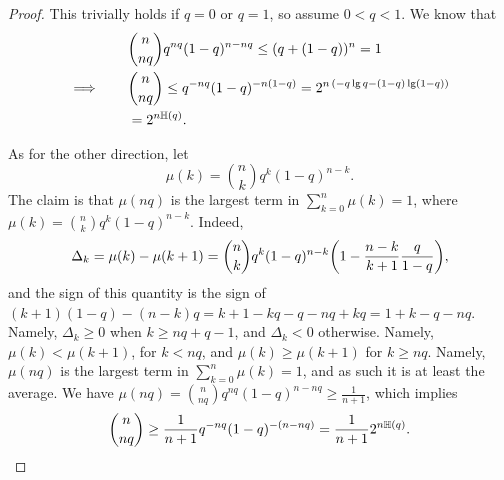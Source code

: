 \begin{proof}
    This trivially holds if $q=0$ or $q=1$, so assume $0 <q <1$. We
    know that
    \begin{align*}
      &\binom{n}{nq}
      q^{nq} (1-q)^{n-nq} \leq (q + (1-q))^n
        =1
      \\
      \implies
      \qquad        
      &
        \binom{n}{nq}
        \leq 
        q^{-nq} (1-q)^{-n(1-q)} = 2^{n \,\pth{-q \lg q - (1-q) \lg (1-q)
        }} \\
        &= 2^{n \Entropy{q}}.
    \end{align*}
    
    As for the other direction, let
    \begin{equation*}
        \mu(k) = \binom{n}{k} q^{k} (1-q)^{n-k}.
    \end{equation*}    
    The claim is that $\mu(nq)$ is the largest term in
    $\sum_{k=0}^{n} \mu(k) = 1$, where
    $\mu(k ) = \binom{n}{k} q^k (1-q)^{n-k}$. Indeed,
    \begin{equation*}
        \Delta_k = \mu(k) - \mu(k+1) = \binom{n}{k}q^k (1-q)^{n-k}
        \pth{ 1 - \frac{n-k}{k+1} \frac{q}{1-q}},
    \end{equation*}
    and the sign of this quantity is the sign of
    $(k+1)(1-q) -(n-k)q = k +1 -kq -q -nq +kq = 1 + k -q -
    nq$. Namely, $\Delta_k \geq 0$ when $k\geq nq + q -1$, and
    $\Delta_k < 0$ otherwise. Namely, $\mu(k) < \mu(k+1)$, for
    $k < nq$, and $\mu(k) \geq \mu(k+1)$ for $k \geq nq$. Namely,
    $\mu(nq)$ is the largest term in $\sum_{k=0}^{n} \mu(k) = 1$, and
    as such it is at least the average. We have
    $\mu(nq) = \binom{n}{nq} q^{nq} (1-q)^{n-nq} \geq \frac{1}{n+1}$,
    which implies
    \begin{equation*}
        \binom{n}{nq} \geq \frac{1}{n+1} q^{-nq} (1-q)^{-(n-nq)} =
        \frac{1}{n+1}2^{n \Entropy{q}}.
    \end{equation*}
\end{proof}

